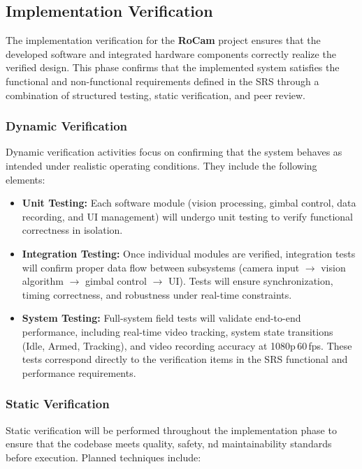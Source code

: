 \documentclass[12pt, titlepage]{article}
\begin{document}


\subsection{Implementation Verification}

The implementation verification for the \textbf{RoCam} project ensures that the
developed software and integrated hardware components correctly realize the
verified design. This phase confirms that the implemented system satisfies the
functional and non-functional requirements defined in the SRS through a
combination of structured testing, static verification, and peer review.

\subsubsection*{Dynamic Verification}
Dynamic verification activities focus on confirming that the system
behaves as intended under realistic operating conditions.
They include the following elements:

\begin{itemize}
  \item \textbf{Unit Testing:}
        Each software module (vision processing, gimbal control, data
        recording, and UI management) will undergo unit testing to verify
        functional correctness in isolation.

  \item \textbf{Integration Testing:}
        Once individual modules are verified, integration tests will
        confirm proper data flow between subsystems (camera input
        $\rightarrow$ vision algorithm $\rightarrow$ gimbal control
        $\rightarrow$ UI).
        Tests will ensure synchronization, timing correctness, and
        robustness under real-time constraints.

  \item \textbf{System Testing:}
        Full-system field tests will validate end-to-end performance,
        including real-time video tracking, system state transitions
        (Idle, Armed, Tracking), and video recording accuracy at 1080p\,60\,fps.
        These tests correspond directly to the verification items in
        the SRS functional and performance requirements.
\end{itemize}

\subsubsection*{Static Verification}
Static verification will be performed throughout the implementation
phase to ensure that the codebase meets quality, safety,
nd maintainability standards before execution.
Planned techniques include:
\end{document}

